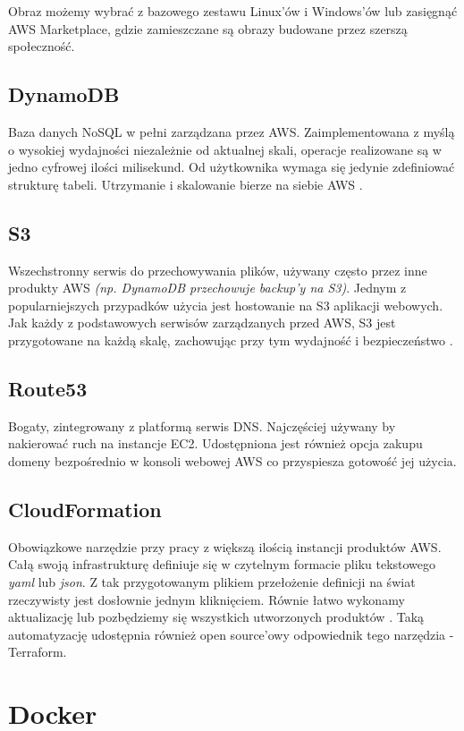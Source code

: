 Obraz możemy wybrać z bazowego zestawu Linux'ów i Windows'ów lub zasięgnąć AWS Marketplace, gdzie zamieszczane są obrazy budowane przez szerszą społeczność.

\subsection{DynamoDB}
Baza danych NoSQL w pełni zarządzana przez AWS. 
Zaimplementowana z myślą o wysokiej wydajności niezależnie od aktualnej skali, operacje realizowane są w jedno cyfrowej ilości milisekund.
Od użytkownika wymaga się jedynie zdefiniować strukturę tabeli. Utrzymanie i skalowanie bierze na siebie AWS \cite{AWS-O}.

\subsection{S3}
Wszechstronny serwis do przechowywania plików, używany często przez inne produkty AWS {\em (np. DynamoDB przechowuje backup'y na S3)}. 
Jednym z popularniejszych przypadków użycia jest hostowanie na S3 aplikacji webowych. 
Jak każdy z podstawowych serwisów zarządzanych przed AWS, S3 jest przygotowane na każdą skalę, zachowując przy tym wydajność i bezpieczeństwo \cite{AWS-O}.

\subsection{Route53}
Bogaty, zintegrowany z platformą serwis DNS. Najczęściej używany by nakierować ruch na instancje EC2. 
Udostępniona jest również opcja zakupu domeny bezpośrednio w konsoli webowej AWS co przyspiesza gotowość jej użycia.

\subsection{CloudFormation} \label{cloudFormation}
Obowiązkowe narzędzie przy pracy z większą ilością instancji produktów AWS. 
Całą swoją infrastrukturę definiuje się w czytelnym formacie pliku tekstowego {\em yaml} lub {\em json}.
Z tak przygotowanym plikiem przełożenie definicji na świat rzeczywisty jest dosłownie jednym kliknięciem. 
Równie łatwo wykonamy aktualizację lub pozbędziemy się wszystkich utworzonych produktów \cite{AWS-O}.
Taką automatyzację udostępnia również open source'owy odpowiednik tego narzędzia - Terraform.


\section{Docker}

